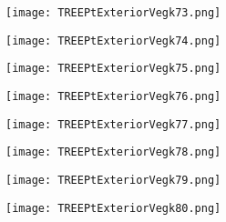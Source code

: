 \documentclass[pdf]{beamer}
\begin{document}
\begin{frame}
\begin{figure}[!h]
\centering
\texttt{[image: TREEPtExteriorVegk73.png]}
\end{figure}
\end{frame}

\begin{frame}
\begin{figure}[!h]
\centering
\texttt{[image: TREEPtExteriorVegk74.png]}
\end{figure}
\end{frame}

\begin{frame}
\begin{figure}[!h]
\centering
\texttt{[image: TREEPtExteriorVegk75.png]}
\end{figure}
\end{frame}

\begin{frame}
\begin{figure}[!h]
\centering
\texttt{[image: TREEPtExteriorVegk76.png]}
\end{figure}
\end{frame}

\begin{frame}
\begin{figure}[!h]
\centering
\texttt{[image: TREEPtExteriorVegk77.png]}
\end{figure}
\end{frame}

\begin{frame}
\begin{figure}[!h]
\centering
\texttt{[image: TREEPtExteriorVegk78.png]}
\end{figure}
\end{frame}

\begin{frame}
\begin{figure}[!h]
\centering
\texttt{[image: TREEPtExteriorVegk79.png]}
\end{figure}
\end{frame}

\begin{frame}
\begin{figure}[!h]
\centering
\texttt{[image: TREEPtExteriorVegk80.png]}
\end{figure}
\end{frame}
\end{document}

